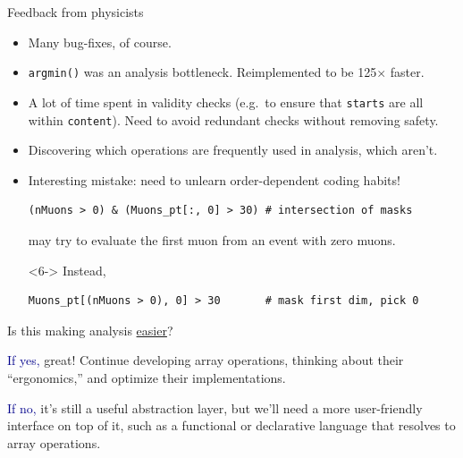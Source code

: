 \documentclass[aspectratio=169]{beamer}
\begin{document}
\begin{frame}[fragile]{Feedback from physicists}
\vspace{0.5 cm}\large
\begin{itemize}\setlength{\itemsep}{0.3 cm}
\item<1-> Many bug-fixes, of course.
\item<2-> {\tt\small argmin()} was an analysis bottleneck. Reimplemented to be 125$\times$ faster.
\item<3-> A lot of time spent in validity checks (e.g.\ to ensure that {\tt \small starts} are all within {\tt \small content}). Need to avoid redundant checks without removing safety.
\item<4-> Discovering which operations are frequently used in analysis, which aren't.
\item<5-> Interesting mistake: need to unlearn order-dependent coding habits!

\small\begin{verbatim}
(nMuons > 0) & (Muons_pt[:, 0] > 30) # intersection of masks
\end{verbatim}
\large

may try to evaluate the first muon from an event with zero muons.

\vspace{0.25 cm}
\begin{uncoverenv}<6->
Instead,

\small\begin{verbatim}
Muons_pt[(nMuons > 0), 0] > 30       # mask first dim, pick 0
\end{verbatim}
\end{uncoverenv}
\end{itemize}
\end{frame}

\begin{frame}{Is this making analysis \underline{easier}?}
\vspace{0.5 cm}
\Large

\begin{center}
\begin{minipage}{0.8\linewidth}
\textcolor{darkblue}{If yes,} great! Continue developing array operations, thinking about their ``ergonomics,'' and optimize their implementations.

\vspace{0.75 cm}
\textcolor{darkblue}{If no,} it's still a useful abstraction layer, but we'll need a more user-friendly interface on top of it, such as a functional or declarative language that resolves to array operations.
\end{minipage}
\end{center}
\end{frame}
\end{document}
